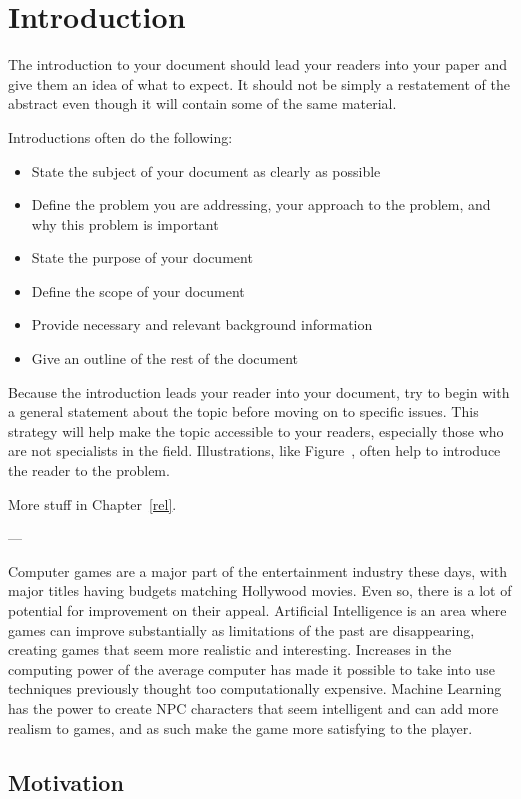 \cleardoublepage
\chapter{Introduction}
\label{intro} The introduction to your document should lead your readers into
your paper and give them an idea of what to expect. It should not be simply a
restatement of the abstract even though it will contain some of the same
material.

Introductions often do the following:
\begin{itemize}
  \item State the subject of your document as clearly as possible

  \item Define the problem you are addressing, your approach to the problem, and
    why this problem is important
  \item State the purpose of your document
  \item Define the scope of your document
  \item Provide necessary and relevant background information
  \item Give an outline of the rest of the document
\end{itemize}


Because the introduction leads your reader into your document, try to begin with
a general statement about the topic before moving on to specific issues. This
strategy will help make the topic accessible to your readers, especially those
who are not specialists in the field. Illustrations, like Figure~, often help to
introduce the reader to the problem.

More stuff in Chapter~\ref{rel}.

---

Computer games are a major part of the entertainment industry these days, with
major titles having budgets matching Hollywood movies. Even so, there is a lot
of potential for improvement on their appeal. Artificial Intelligence is an area
where games can improve substantially as limitations of the past are
disappearing, creating games that seem more realistic and interesting. Increases
in the computing power of the average computer has made it possible to take into
use techniques previously thought too computationally expensive. Machine
Learning has the power to create NPC characters that seem intelligent and can
add more realism to games, and as such make the game more satisfying to the
player.

\section{Motivation}
\label{sec:motivation}

